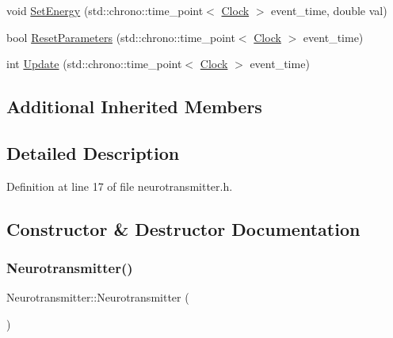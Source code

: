 \begin{DoxyCompactItemize}
\item 
void \hyperlink{class_neurotransmitter_a5ad51ddb1351868e1756e3c41bb88e04}{Set\+Energy} (std\+::chrono\+::time\+\_\+point$<$ \hyperlink{universe_8h_a0ef8d951d1ca5ab3cfaf7ab4c7a6fd80}{Clock} $>$ event\+\_\+time, double val)
\item 
bool \hyperlink{class_neurotransmitter_a6e7650d738bccfbbd49ede10970687aa}{Reset\+Parameters} (std\+::chrono\+::time\+\_\+point$<$ \hyperlink{universe_8h_a0ef8d951d1ca5ab3cfaf7ab4c7a6fd80}{Clock} $>$ event\+\_\+time)
\item 
int \hyperlink{class_neurotransmitter_ac9f7be22ca7242207de76ec5e1b055b1}{Update} (std\+::chrono\+::time\+\_\+point$<$ \hyperlink{universe_8h_a0ef8d951d1ca5ab3cfaf7ab4c7a6fd80}{Clock} $>$ event\+\_\+time)
\end{DoxyCompactItemize}
\subsection*{Additional Inherited Members}


\subsection{Detailed Description}


Definition at line 17 of file neurotransmitter.\+h.



\subsection{Constructor \& Destructor Documentation}
\mbox{\label{class_neurotransmitter_a05883c62f2c20b8034121a46c50de00f}} 
\subsubsection{\texorpdfstring{Neurotransmitter()}{Neurotransmitter()}\hspace{0.1cm}{\footnotesize\ttfamily [1/4]}}
{\footnotesize\ttfamily Neurotransmitter\+::\+Neurotransmitter (\begin{DoxyParamCaption}{ }\end{DoxyParamCaption})\hspace{0.3cm}{\ttfamily [inline]}}



